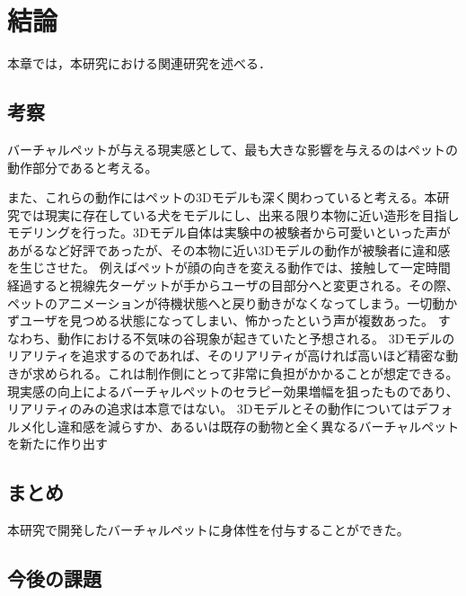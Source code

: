 ﻿\chapter{結論}
本章では，本研究における関連研究を述べる．

\section{考察}

バーチャルペットが与える現実感として、最も大きな影響を与えるのはペットの動作部分であると考える。


また、これらの動作にはペットの3Dモデルも深く関わっていると考える。本研究では現実に存在している犬をモデルにし、出来る限り本物に近い造形を目指しモデリングを行った。3Dモデル自体は実験中の被験者から可愛いといった声があがるなど好評であったが、その本物に近い3Dモデルの動作が被験者に違和感を生じさせた。
例えばペットが顔の向きを変える動作では、接触して一定時間経過すると視線先ターゲットが手からユーザの目部分へと変更される。その際、ペットのアニメーションが待機状態へと戻り動きがなくなってしまう。一切動かずユーザを見つめる状態になってしまい、怖かったという声が複数あった。
すなわち、動作における不気味の谷現象が起きていたと予想される。
3Dモデルのリアリティを追求するのであれば、そのリアリティが高ければ高いほど精密な動きが求められる。これは制作側にとって非常に負担がかかることが想定できる。
現実感の向上によるバーチャルペットのセラピー効果増幅を狙ったものであり、リアリティのみの追求は本意ではない。
3Dモデルとその動作についてはデフォルメ化し違和感を減らすか、あるいは既存の動物と全く異なるバーチャルペットを新たに作り出す

\section{まとめ}

本研究で開発したバーチャルペットに身体性を付与することができた。


\section{今後の課題}